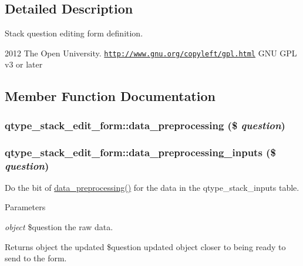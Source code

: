 \subsection{Detailed Description}
Stack question editing form definition.

2012 The Open University.  \href{http://www.gnu.org/copyleft/gpl.html}{\tt http://www.gnu.org/copyleft/gpl.html} GNU GPL v3 or later 

\subsection{Member Function Documentation}
\hypertarget{classqtype__stack__edit__form_a3a6f3817b03966c85e356ac8ca5cf282}{
\subsubsection[{data\_\-preprocessing}]{\setlength{\rightskip}{0pt plus 5cm}qtype\_\-stack\_\-edit\_\-form::data\_\-preprocessing (\$ {\em question})}}
\label{classqtype__stack__edit__form_a3a6f3817b03966c85e356ac8ca5cf282}
\hypertarget{classqtype__stack__edit__form_ae4163ca2550cf1be3aaa8455cfa53290}{
\subsubsection[{data\_\-preprocessing\_\-inputs}]{\setlength{\rightskip}{0pt plus 5cm}qtype\_\-stack\_\-edit\_\-form::data\_\-preprocessing\_\-inputs (\$ {\em question})}}
\label{classqtype__stack__edit__form_ae4163ca2550cf1be3aaa8455cfa53290}
Do the bit of \hyperlink{classqtype__stack__edit__form_a3a6f3817b03966c85e356ac8ca5cf282}{data\_\-preprocessing()} for the data in the qtype\_\-stack\_\-inputs table. 
\begin{DoxyParams}{Parameters}
\item[{\em object}]\$question the raw data. \end{DoxyParams}
\begin{DoxyReturn}{Returns}
object the updated \$question updated object closer to being ready to send to the form. 
\end{DoxyReturn}
